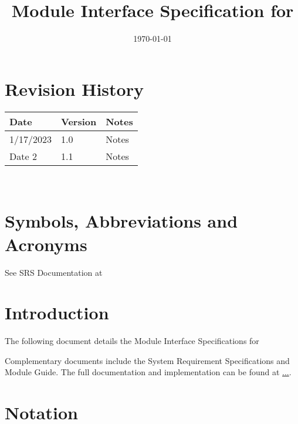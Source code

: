 \documentclass[12pt, titlepage]{article}
\begin{document}
\title{Module Interface Specification for \progname{}}

\author{\authname}

\date{\today}

\maketitle


\section{Revision History}

\begin{tabularx}{\textwidth}{p{3cm}p{2cm}X}
\toprule {\bf Date} & {\bf Version} & {\bf Notes}\\
\midrule
1/17/2023 & 1.0 & Notes\\
Date 2 & 1.1 & Notes\\
\bottomrule
\end{tabularx}

~\newpage

\section{Symbols, Abbreviations and Acronyms}

See SRS Documentation at 


\newpage

\tableofcontents

\newpage


\section{Introduction}

The following document details the Module Interface Specifications for

Complementary documents include the System Requirement Specifications
and Module Guide.  The full documentation and implementation can be
found at \url{...}.  

\section{Notation}
\end{document}
